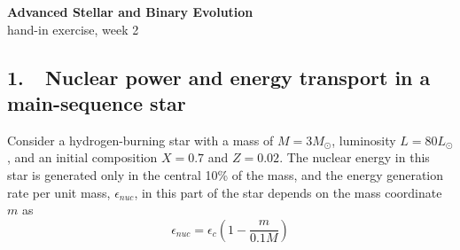 \documentclass[a4paper,11pt]{article}
\newcommand{\Msun}{\ensuremath{{M}_\odot}}
\newcommand{\Lsun}{\ensuremath{{L}_\odot}}
\begin{document}
\begin{center}
{\Large\bf Advanced Stellar and Binary Evolution} \\ [1ex]
{\large hand-in exercise, week 2}

\end{center}

\subsection*{1.~~Nuclear power and energy transport in a main-sequence star}
\label{ex:rad-conv-cores}

Consider a hydrogen-burning star with a mass of $M=3\Msun$, luminosity $L=80\Lsun$, and an initial composition $X=0.7$ and $Z=0.02$. The nuclear energy in this star is generated only in the central 10\% of the mass, and the energy generation rate per unit mass, $\epsilon_{nuc}$, in this part of the star depends on the mass coordinate $m$ as
\[
\epsilon_{nuc}=\epsilon_c\left( 1-\frac{m}{0.1M}\right)
\]
\end{document}
